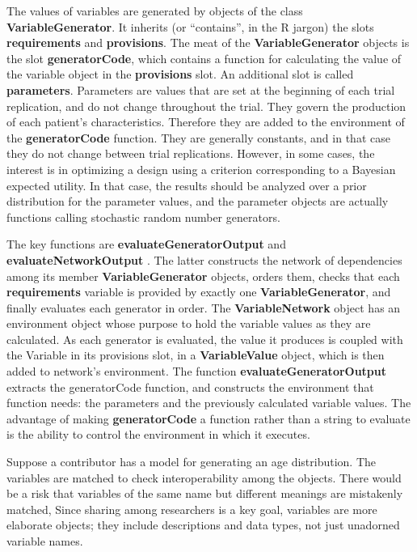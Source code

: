 \documentclass[12pt]{amsart}
\newcommand{\Rcode}[1]{{\textbf{#1}}}
\begin{document}
The values of variables are generated by objects of the class \Rcode{VariableGenerator}.
It inherits (or ``contains'', in the R jargon) the slots \Rcode{requirements} and \Rcode{provisions}.
The meat of the \Rcode{VariableGenerator} objects is the slot \Rcode{generatorCode},
which contains a function for calculating the value of the variable object in the \Rcode{provisions} slot.
An additional slot is called \Rcode{parameters}. 
Parameters are values that are set at the beginning of each trial replication,
and do not change throughout the trial. 
They govern the production of each patient's characteristics. 
Therefore they are added to the environment of the \Rcode{generatorCode} function.
They are generally constants, and in that case they do not change between trial replications.
However, in some cases, the interest is in optimizing a design
using a criterion corresponding to a Bayesian expected utility.
In that case, the results should be analyzed over a prior distribution
for the parameter values, and the parameter objects are actually 
functions calling stochastic random number generators.

The key functions are \Rcode{evaluateGeneratorOutput}  and \Rcode{evaluateNetworkOutput} .
The latter constructs the network of dependencies among its member \Rcode{VariableGenerator}
objects, orders them, checks that each \Rcode{requirements} variable is provided by exactly one
\Rcode{VariableGenerator}, and finally evaluates each generator in order. 
 The \Rcode{VariableNetwork} object has an environment object whose purpose 
 to hold the variable values as they are calculated.
As each generator is evaluated, the value it produces is coupled with the Variable in its provisions slot,
in a \Rcode{VariableValue} object, which is then added to network's environment.
The  function \Rcode{evaluateGeneratorOutput} extracts the generatorCode function, 
 and constructs the environment that function needs: the parameters and the previously calculated variable values. 
 The advantage of making \Rcode{generatorCode} a function rather than a string to evaluate
 is the ability to control the environment in which it executes.
 

Suppose a contributor has a model for generating an age distribution.
The variables are matched to check interoperability among the objects. 
There would be a risk that variables of the same name but different meanings are mistakenly matched,
Since sharing among researchers is a key goal,
variables are more elaborate objects;
they include descriptions and data types, not just unadorned variable names.
\end{document}
